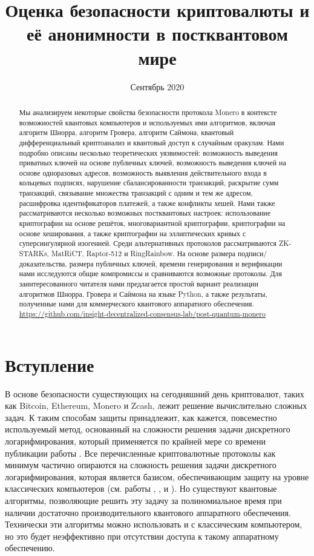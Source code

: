 \documentclass{mrl}
\title{Оценка безопасности криптовалюты и её анонимности в постквантовом мире}
\date{Сентябрь 2020}
\begin{document}
\vspace{-0.25cm}
\begin{abstract}

Мы анализируем некоторые свойства безопасности протокола Monero в контексте возможностей квантовых компьютеров и используемых ими алгоритмов, включая алгоритм Шнорра, алгоритм Гровера, алгоритм Саймона, квантовый дифференциальный криптоанализ и квантовый доступ к случайным оракулам. Нами подробно описаны несколько теоретических уязвимостей: возможность выведения приватных ключей на основе публичных ключей, возможность выведения ключей на основе одноразовых адресов, возможность выявления действительного входа в кольцевых подписях, нарушение сбалансированности транзакций, раскрытие сумм транзакций, связывание множества транзакций с одним и тем же адресом, расшифровка идентификаторов платежей, а также конфликты хешей. Нами также рассматриваются несколько возможных постквантовых настроек: использование криптографии на основе решёток, многовариантной криптографии, криптографии на основе хеширования, а также криптографии на эллиптических кривых с суперсингулярной изогенией. Среди альтернативных протоколов рассматриваются ZK-STARKs, MatRiCT, Raptor-512 и RingRainbow. На основе размера подписи/доказательства, размера публичных ключей, времени генерирования и верификации нами исследуются общие компромиссы и сравниваются возможные протоколы. Для заинтересованного читателя нами предлагается простой вариант реализации алгоритмов Шнорра, Гровера и Саймона на языке Python, а также результаты, полученные нами для коммерческого квантового аппаратного обеспечения.\\ \url{https://github.com/insight-decentralized-consensus-lab/post-quantum-monero}
 
\end{abstract}


\section{Вступление}

В основе безопасности существующих на сегодняшний день криптовалют, таких как Bitcoin, Ethereum, Monero и Zcash, лежит решение вычислительно сложных задач. К таким способам защиты принадлежит, как кажется, повсеместно используемый метод, основанный на сложности решения задачи дискретного логарифмирования, который применяется по крайней мере со времени публикации работы \cite{diffie1976new}. Все перечисленные криптовалютные протоколы как минимум частично опираются на сложность решения задачи дискретного логарифмирования, которая является базисом, обеспечивающим защиту на уровне классических компьютеров (см. работы \cite{masteringbitcoin}, \cite{masteringethereum}, \cite{masteringmonero} и \cite{zcashprotocol}). Но существуют квантовые алгоритмы, позволяющие решить эту задачу за полиномиальное время при наличии достаточно производительного квантового аппаратного обеспечения. Технически эти алгоритмы можно использовать и с классическим компьютером, но это будет неэффективно при отсутствии доступа к такому аппаратному обеспечению.
\end{document}
